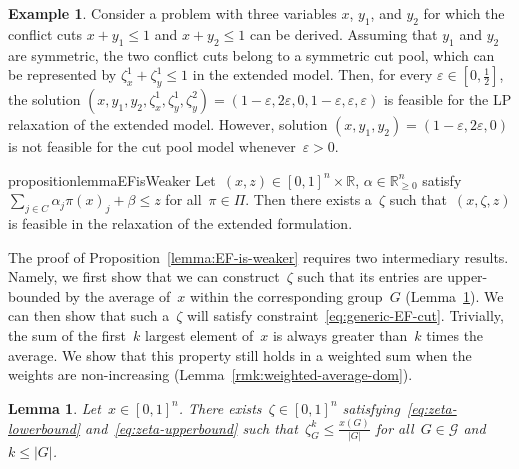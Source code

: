 \documentclass[10pt,a4paper]{amsart}
\newcommand{\R}{\mathds{R}}
\newtheorem{lemma}[theorem]{Lemma}
\theoremstyle{definition}
\newtheorem{example}[theorem]{Example}
\begin{document}
\begin{example}
  Consider a problem with three variables $x$, $y_1$, and $y_2$ for which the conflict cuts $x + y_1 \leq 1$ and $x + y_2 \leq 1$ can be derived.
  Assuming that $y_1$ and $y_2$ are symmetric, the two conflict cuts belong to a symmetric cut pool, which can be represented by $\zeta^1_x + \zeta^1_y \leq 1$ in the extended model.
  Then, for every $\varepsilon \in [0,\frac{1}{2}]$, the solution $(x,y_1,y_2,\zeta^1_x,\zeta^1_y,\zeta^2_y) = (1-\varepsilon, 2\varepsilon, 0, 1-\varepsilon,\varepsilon,\varepsilon)$ is feasible for the LP relaxation of the extended model.
  However, solution $(x,y_1,y_2) = (1-\varepsilon,2\varepsilon,0)$ is not feasible for the cut pool model whenever~$\varepsilon > 0$.
\end{example}

\begin{restatable}{proposition}{lemmaEFisWeaker}
  \label{lemma:EF-is-weaker}
  Let~$(x,z)\in[0, 1]^{n}\times\R$, $\alpha\in\R^n_{\geq 0}$ satisfy~$\sum_{j\in C} \alpha_j \pi(x)_j +\beta \leq z$ for all~$\pi\in\Pi$.
  Then there exists a~$\zeta$ such that~$(x,\zeta, z)$ is feasible in the relaxation of the extended formulation.
\end{restatable}

The proof of Proposition~\ref{lemma:EF-is-weaker} requires two intermediary results.
Namely, we first show that we can construct~$\zeta$ such that its entries are upper-bounded by the average of~$x$ within the corresponding group~$G$ (Lemma~\ref{rmk:zeta-lb}).
We can then show that such a~$\zeta$ will satisfy constraint~\eqref{eq:generic-EF-cut}.
Trivially, the sum of the first~$k$ largest element of~$x$ is always greater than~$k$ times the average.
We show that this property still holds in a weighted sum when the weights are non-increasing (Lemma~\ref{rmk:weighted-average-dom}).

\begin{lemma}
  \label{rmk:zeta-lb}
  Let~$x\in[0, 1]^n$. 
  There exists~$\zeta\in [0, 1]^n$ satisfying~\eqref{eq:zeta-lowerbound} and~\eqref{eq:zeta-upperbound} such that~$\zeta^k_G \leq \frac{x(G)}{|G|}$ for all~$G\in\mathcal{G}$ and~$k\leq|G|$.
\end{lemma}
\end{document}
